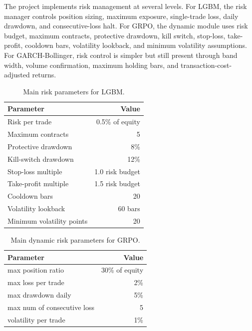 \documentclass[11pt,a4paper]{article}
\begin{document}
The project implements risk management at several levels. For LGBM, the risk manager controls position sizing, maximum exposure, single-trade loss, daily drawdown, and consecutive-loss halt. For GRPO, the dynamic module uses risk budget, maximum contracts, protective drawdown, kill switch, stop-loss, take-profit, cooldown bars, volatility lookback, and minimum volatility assumptions. For GARCH-Bollinger, risk control is simpler but still present through band width, volume confirmation, maximum holding bars, and transaction-cost-adjusted returns.

\begin{table}[H]
    \centering
    \caption{Main risk parameters for LGBM.}
    \label{tab:lgbm-risk-params}
    \begin{tabular}{lr}
        \toprule
        Parameter & Value \\
        \midrule
        Risk per trade & 0.5\% of equity \\
        Maximum contracts & 5 \\
        Protective drawdown & 8\% \\
        Kill-switch drawdown & 12\% \\
        Stop-loss multiple & 1.0 risk budget \\
        Take-profit multiple & 1.5 risk budget \\
        Cooldown bars & 20 \\
        Volatility lookback & 60 bars \\
        Minimum volatility points & 20 \\
        \bottomrule
    \end{tabular}
\end{table}

\begin{table}[H]
    \centering
    \caption{Main dynamic risk parameters for GRPO.}
    \label{tab:risk-params}
    \begin{tabular}{lr}
        \toprule
        Parameter & Value \\
        \midrule
        max position ratio & 30\% of equity \\
        max loss per trade & 2\% \\
        max drawdown daily & 5\% \\
        max num of consecutive loss & 5 \\
        volatility per trade & 1\% \\
        \bottomrule
    \end{tabular}
\end{table}
\end{document}
